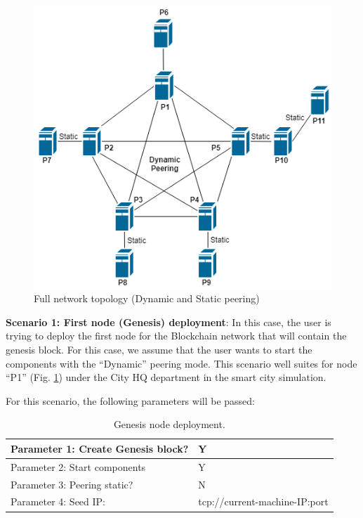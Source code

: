 \begin{figure}[H] %
    \centering
    \includegraphics[scale=.5]{figs/peering.png}
    \setlength{\belowcaptionskip}{-5pt}
    \caption{Full network topology (Dynamic and Static peering)}
    \label{fig:peering} %
\end{figure}

\textbf{Scenario 1: First node (Genesis) deployment}: 
In this case, the user is trying to deploy the first node for the Blockchain network that will contain the genesis block. For this case, we assume that the user wants to start the components with the “Dynamic” peering mode. This scenario well suites for node ``P1'' (Fig. \ref{fig:peering}) under the City HQ department in the smart city simulation. 

For this scenario, the following parameters will be passed:
\begin{table}[H]
\centering
\label{tab:genesis_install}
\begin{tabular}{|l|l|}
\hline
Parameter 1: Create Genesis block? & Y         \\ \hline
Parameter 2: Start components      & Y         \\ \hline
Parameter 3: Peering static?       & N         \\ \hline
Parameter 4: Seed IP:              & tcp://current-machine-IP:port \\ \hline
\end{tabular}
\caption{Genesis node deployment.}
\vspace{-4mm}
\end{table}

